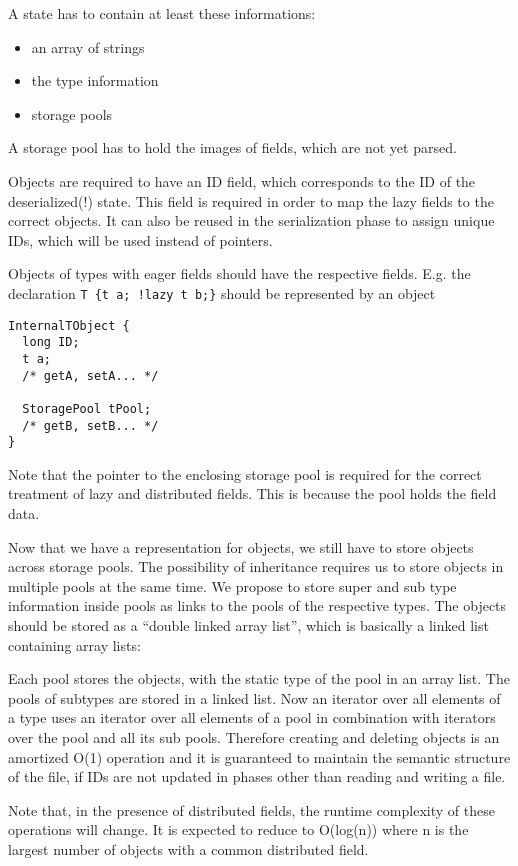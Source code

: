 A state has to contain at least these informations:
\begin{itemize}
 \item an array of strings
 \item the type information
 \item storage pools
\end{itemize}

A storage pool has to hold the images of fields, which are not yet parsed.

Objects are required to have an ID field, which corresponds to the ID of the deserialized(!) state. This field is required in order to map the lazy fields to the correct objects. It can also be reused in the serialization phase to assign unique IDs, which will be used instead of pointers.

Objects of types with eager fields should have the respective fields. E.g. the declaration \verb/T {t a; !lazy t b;}/ should be represented by an object
\begin{verbatim}
InternalTObject { 
  long ID;
  t a;
  /* getA, setA... */
  
  StoragePool tPool;
  /* getB, setB... */
}
\end{verbatim}

Note that the pointer to the enclosing storage pool is required for the correct treatment of lazy and distributed fields. This is because the pool holds the field data.


Now that we have a representation for objects, we still have to store objects across storage pools. The possibility of inheritance requires us to store objects in multiple pools at the same time.
We propose to store super and sub type information inside pools as links to the pools of the respective types. The objects should be stored as a ``double linked array list'', which is basically a linked list containing array lists:

Each pool stores the objects, with the static type of the pool in an array list. The pools of subtypes are stored in a linked list. Now an iterator over all elements of a type uses an iterator over all elements of a pool in combination with iterators over the pool and all its sub pools. Therefore creating and deleting objects is an amortized O(1) operation and it is guaranteed to maintain the semantic structure of the file, if IDs are not updated in phases other than reading and writing a file.

Note that, in the presence of distributed fields, the runtime complexity of these operations will change. It is expected to reduce to O(log(n)) where n is the largest number of objects with a common distributed field.


